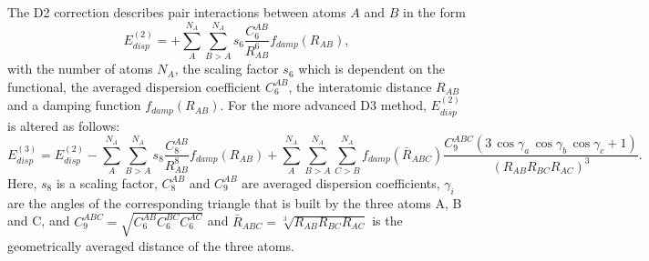 \documentclass[11pt,DIV=13,BCOR=5mm,a4paper,headinclude]{scrbook}
\begin{document}
The D2 correction describes pair interactions between atoms $A$ and $B$ in the form
\begin{equation}\label{eq:d2}
 E_{disp}^{(2)} =+\sum\limits_{A}^{N_A}\sum\limits_{B>A}^{N_A} s_6 \frac{C_6^{AB}}{R_{AB}^6}f_{damp}(R_{AB}),
\end{equation}
with the number of atoms $N_A$, the scaling factor $s_6$ which is dependent on the functional, the averaged dispersion coefficient $C^{AB}_6$, the interatomic distance $R_{AB}$ and a damping function $f_{damp}(R_{AB})$.
For the more advanced D3 method, $E_{disp}^{(2)}$ is altered as follows:
\begin{equation}
  E_{disp}^{(3)} =E_{disp}^{(2)} - \sum\limits_{A}^{N_A}\sum\limits_{B>A}^{N_A} s_8 \frac{C_8^{AB}}{R_{AB}^8}f_{damp}(R_{AB}) +\sum\limits_{A}^{N_A}\sum\limits_{B>A}^{N_A}\sum\limits_{C>B}^{N_A} f_{damp}(\bar{R}_{ABC}) \frac{C_9^{ABC}(3\,\cos\gamma_a\, \cos\gamma_b\, \cos\gamma_c+1)}{(R_{AB}R_{BC}R_{AC})^3}.
\end{equation}
Here, $s_8$ is a scaling factor, $C_8^{AB}$ and $C_9^{AB}$ are averaged dispersion coefficients, $\gamma_i$ are the angles of the corresponding triangle that is built by the three atoms A, B and C, and $C_9^{ABC}=\sqrt{C_6^{AB}C_6^{BC}C_6^{AC}}$ and $\bar{R}_{ABC}=\sqrt[3]{R_{AB}R_{BC}R_{AC}}$ is the geometrically averaged distance of the three atoms.


\end{document}

